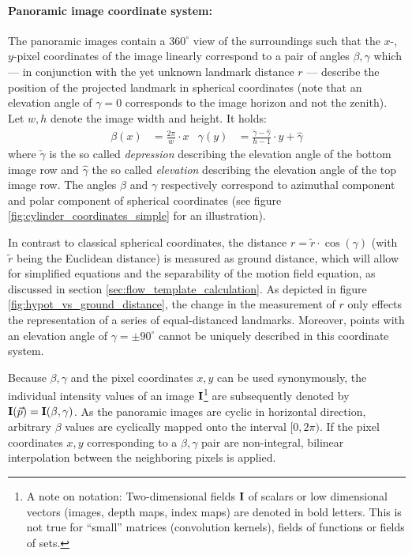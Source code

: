\paragraph{Panoramic image coordinate system:}
\label{sec:panoramic_coordinates}
The panoramic images contain a $360^\circ$ view of the surroundings such that the $x$-, $y$-pixel coordinates of the image linearly correspond to a pair of angles $\beta, \gamma$ which --- in conjunction with the yet unknown landmark distance $r$ --- describe the position of the projected landmark in spherical coordinates (note that an elevation angle of $\gamma = 0$ corresponds to the image horizon and not the zenith). Let $w, h$ denote the image width and height. It holds:
\begin{align*}
 \beta(x) &= \frac{2 \pi}w \cdot x & \gamma(y) &= \frac{\check \gamma - \hat \gamma}{h - 1} \cdot y + \hat \gamma
\end{align*}
where $\check \gamma$ is the so called \textit{depression} describing the elevation angle of the bottom image row and $\hat \gamma$ the so called \textit{elevation} describing the elevation angle of the top image row. The angles $\beta$ and $\gamma$ respectively correspond to azimuthal component and polar component of spherical coordinates (see figure \ref{fig:cylinder_coordinates_simple} for an illustration).

In contrast to classical spherical coordinates, the distance $r = \tilde r \cdot \cos(\gamma)$ (with $\tilde r$ being the Euclidean distance) is measured as ground distance, which will allow for simplified equations and the separability of the motion field equation, as discussed in section \ref{sec:flow_template_calculation}. As depicted in figure \ref{fig:hypot_vs_ground_distance}, the change in the measurement of $r$ only effects the representation of a series of equal-distanced landmarks. Moreover, points with an elevation angle of $\gamma = \pm 90^\circ$ cannot be uniquely described in this coordinate system.

Because $\beta, \gamma$ and the pixel coordinates $x, y$ can be used synonymously, the individual intensity values of an image $\mathbf{I}$\footnote{A note on notation: Two-dimensional fields $\mathbf{I}$ of scalars or low dimensional vectors (images, depth maps, index maps) are denoted in bold letters. This is not true for ``small'' matrices (convolution kernels), fields of functions or fields of sets.} are subsequently denoted by $\img{I}(\vec p) = \img{I}(\beta, \gamma)$. As the panoramic images are cyclic in horizontal direction, arbitrary $\beta$ values are cyclically mapped onto the interval $[0, 2\pi)$. If the pixel coordinates $x, y$ corresponding to a $\beta, \gamma$ pair are non-integral, bilinear interpolation between the neighboring pixels is applied.

